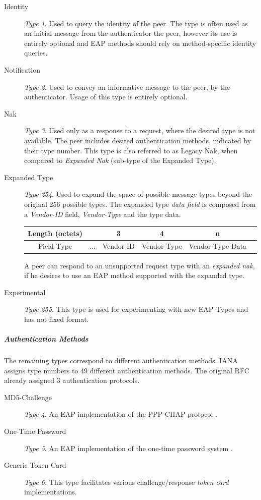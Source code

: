 \begin{description}
	\item[Identity] \textit{Type 1}. Used to query the identity of the peer. The type is often used as an initial message from the authenticator the peer, however its use is entirely optional and EAP methods should rely on method-specific identity queries.
	
	\item[Notification]\textit{Type 2}. Used to convey an informative message to the peer, by the authenticator. Usage of this type is entirely optional.
	\item[Nak]\textit{Type 3}. Used only as a response to a request, where the desired type is not available.
	The peer includes desired authentication methods, indicated by their type number.
	This type is also referred to as Legacy Nak, when compared to \textit{Expanded Nak} (sub-type of the Expanded Type).
	\item[Expanded Type] \textit{Type 254}. 
	Used to expand the space of possible message types beyond the original 256 possible types.
	The expanded type \textit{data field} is composed from a \textit{Vendor-ID} field, \textit{Vendor-Type} and the type data.
	\bigskip
	\begin{center}
		\begin{tabular}{|c|c|c|c|c|c|}
		\cline{2-5}
		\hline
		Length (octets) & & 3 & 4 & n\\
		\hline
		Field Type & ... & Vendor-ID & Vendor-Type & Vendor-Type Data\\
		\hline
		\end{tabular}
	\end{center}
	\bigskip
	A peer can respond to an unsupported request type with an \textit{expanded nak}, if he desires to use an EAP method supported with the expanded type.
	\item[Experimental] \textit{Type 255}. This type is used for experimenting with new EAP Types and has not fixed format.
\end{description}

\subparagraph{Authentication Methods}
The remaining types correspond to different authentication methods.
IANA \cite{joseph2004eap} assigns type numbers to 49 different authentication methods.
The original RFC \cite{aboba2004extensible} already assigned 3 authentication protocols.

\begin{description}
	\item[MD5-Challenge] \textit{Type 4}. An EAP implementation of the PPP-CHAP protocol \cite{simon2008eap}.
	\item[One-Time Password] \textit{Type 5}. An EAP implementation of the one-time password system \cite{haller1998one}.
	\item[Generic Token Card] \textit{Type 6.} This type facilitates various challenge/response \textit{token card} implementations.
\end{description}

